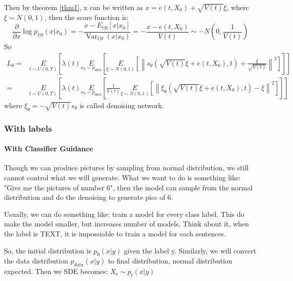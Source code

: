 Then by theorem \ref{thm1}, x can be written as $x=e(t, X_0)+\sqrt{V(t)}\xi$, where $\xi\sim N(0, 1)$, then the score function is:
\begin{equation}
    \frac{\partial}{\partial x} \log p_{t | 0}\left(x | x_{0}\right)=-\frac{x-E_{t | 0}\left[x | x_{0}\right]}{\operatorname{Var}_{t | 0}\left(x | x_{0}\right)}=-\frac{x-e(t, X_0)}{V(t)}\sim -N\left(0, \frac{1}{V(t)}\right)
\end{equation}
So
\begin{equation}
\begin{aligned}
    L_\theta=&\underset{t\sim U(0,T)}{E}\left[\lambda (t)\underset{x_0\sim p_{data}}{E}\left[\underset{\xi\sim N(0, 1)}{E}\left[\left\|s_\theta\left(\sqrt{V(t)}\xi+e(t, X_0), t\right) + \frac{\xi}{\sqrt{V(t)}}\right\|^2\right]\right]\right]\\
    =&\underset{t\sim U(0,T)}{E}\left[\lambda (t)\underset{x_0\sim p_{data}}{E}\left[\frac{1}{V(t)}\underset{\xi\sim N(0, 1)}{E}\left[\left\|\xi_\theta\left(\sqrt{V(t)}\xi+e(t, X_0), t\right)-\xi\right\|^2\right]\right]\right]
\end{aligned}    
\end{equation}
where $\xi_\theta = -\sqrt{V(t)}s_\theta$ is called denoising network.

\subsubsection{With labels}

\paragraph{With Classifier Guidance}
Though we can produce pictures by sampling from normal distribution, we still cannot control what we will generate. What we want to do is something like:
"Give me the pictures of number 6", then the model can sample from the normal distribution and do the denoising to generate pics of 6. 

Usually, we can do something like: train a model for every class label. This do make the model smaller, but increases number of models. 
Think about it, when the label is TEXT, it is impossiable to train a model for each sentences. 

So, the initial distribution is $p_0(x|y)$ given the label y. Similarly, we will convert the data distribution $p_{data}(x|y)$ to final distribution, normal distribution expected.
Then we SDE becomes: $X_t \sim p_t(x|y)$



